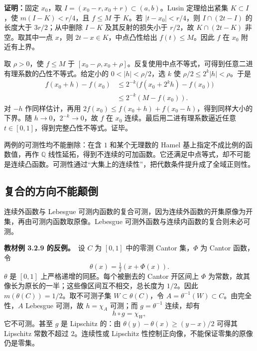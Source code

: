 \documentclass[11pt,a4paper]{article}
\begin{document}
\textbf{证明：}固定 \(x_0\)，取 \(I=(x_0-r,x_0+r)\subset(a,b)\)。Lusin
定理给出紧集 \(K\subset I\)，使 \(m(I-K)<r/4\)，且 \(f\le M\) 于
\(K\)。若 \(|t-x_0|<r/4\)，则 \(I\cap(2t-I)\) 的长度大于
\(3r/2\)；从中删除 \(I-K\) 及其反射的损失小于 \(r/2\)，故
\(K\cap(2t-K)\) 非空。取其中一点 \(x\)，则 \(2t-x\in K\)，中点凸性给出
\(f(t)\le M\)。因此 \(f\) 在 \(x_0\) 附近有上界。

取 \(\rho>0\)，使 \(f\le M\) 于
\([x_0-\rho,x_0+\rho]\)。反复使用中点不等式，可得到任意二进有理系数的凸性不等式。给定小的
\(0<|h|<\rho/2\)，选 \(k\) 使 \(\rho/2\le2^k|h|<\rho\)。于是 \[
\begin{aligned}
f(x_0+h)-f(x_0)
&\le2^{-k}\bigl(f(x_0+2^kh)-f(x_0)\bigr)\\
&\le2^{-k}(M-f(x_0)).
\end{aligned}
\] 对 \(-h\) 作同样估计，再用
\(2f(x_0)\le f(x_0+h)+f(x_0-h)\)，得到同样大小的下界。随
\(h\to0\)，\(2^{-k}\to0\)，故 \(f\) 在 \(x_0\)
连续。最后用二进有理系数逼近任意
\(t\in[0,1]\)，得到完整凸性不等式。证毕。

两例的可测性均不能删除：在含 \(1\) 和某个无理数的 Hamel
基上指定不成比例的函数值，再作 \(\mathbb Q\)
线性延拓，得到不连续的可加函数。它还满足中点等式，却不可能是连续凸函数。可测性通过``大集上的连续性''，把代数条件提升成了全域正则性。

\subsection*{复合的方向不能颠倒}\label{ux590dux5408ux7684ux65b9ux5411ux4e0dux80fdux98a0ux5012}

连续外函数与 Lebesgue
可测内函数的复合可测，因为连续外函数的开集原像为开集，再由可测内函数取原像。Lebesgue
可测外函数与连续内函数的复合则未必可测。

\textbf{教材例 3.2.9 的反例。}　设 \(C\) 为 \([0,1]\) 中的零测 Cantor
集，\(\Phi\) 为 Cantor 函数，令 \[
\theta(x)=\tfrac12(x+\Phi(x)).
\] \(\theta\) 是 \([0,1]\) 上严格递增的同胚。每个被删去的 Cantor
开区间上 \(\Phi\)
为常数，故其像长为原长的一半；这些像区间互不相交，总长度为 \(1/2\)。因此
\(m(\theta(C))=1/2\)。取不可测子集 \(W\subset\theta(C)\)，令
\(A=\theta^{-1}(W)\subset C\)。由完全性，\(A\) Lebesgue 可测，故
\(h=\chi_A\) 可测；而 \(g=\theta^{-1}\) 连续，却有 \[
h\circ g=\chi_W,
\] 它不可测。甚至 \(g\) 是 Lipschitz 的：由
\(\theta(y)-\theta(x)\ge(y-x)/2\) 可得其 Lipschitz 常数不超过
\(2\)。连续性或 Lipschitz 性控制正向像，不能保证零集的原像仍是零集。
\end{document}
